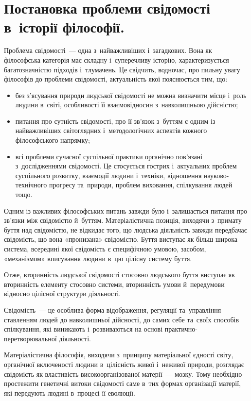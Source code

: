 \documentclass[a5paper,oneside,DIV=12,12pt,headings=small]{scrartcl}
\begin{document}
	\section{Постановка проблеми свідомості в~історії філософії.}
		Проблема свідомості~— одна з~найважливіших і~загадкових. Вона як філософська категорія має складну і~суперечливу історію, характеризується багатозначністю підходів і~тлумачень. Це свідчить, водночас, про пильну увагу філософів до проблеми свідомості, актуальність якої пояснюється тим, що:
		\begin{itemize}
			\item без з'я\-су\-ван\-ня природи людської свідомості не можна визначити місце і~роль людини в~світі, особливості її взаємовідносин з~навколишньою дійсністю;
			\item питання про сутність свідомості, про її зв'я\-зок з~буттям є одним із найважливіших світоглядних і~методологічних аспектів кожного філософського напрямку;
			\item всі проблеми сучасної суспільної практики органічно пов'\-я\-за\-ні з~дослідженнями свідомості. Це стосується гострих і~актуальних проблем суспільного розвитку, взаємодії людини і~техніки, відношення науково-технічного прогресу та~природи, проблем виховання, спілкування людей тощо.
		\end{itemize}

		Одним із важливих філософських питань завжди було і~залишається питання про зв'я\-зки між свідомістю й~буттям. Матеріалістична позиція, виходячи з~примату буття над свідомістю, не відкидає того, що людська діяльність завжди передбачає свідомість, що вона «пронизана» свідомістю. Буття виступає як більш широка система, всередині якої свідомість є специфічною умовою, засобом, «механізмом» вписування людини в~цю цілісну систему буття.
		
		Отже, вторинність людської свідомості стосовно людського буття виступає як вторинність елементу стосовно системи, вторинність умови й~передумови відносно цілісної структури діяльності.

		Свідомість~— це особлива форма відображення, регуляції та~управління ставленням людей до навколишньої дійсності, до самих себе та~своїх способів спілкування, які виникають і~розвиваються на основі практично-перетворювальної діяльності.

		Матеріалістична філософія, виходячи з~принципу матеріальної єдності світу, органічної включеності людини в~цілісність живої і~неживої природи, розглядає свідомість як властивість високоорганізованої матерії~— мозку. Тому необхідно простежити генетичні витоки свідомості саме в~тих формах організації матерії, які передують людині в~процесі її еволюції.
\end{document}
